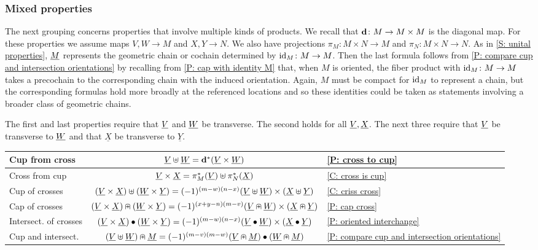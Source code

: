 \subsubsection{Mixed properties}\label{S: mixed formulas}

The next grouping concerns properties that involve multiple kinds of products.
We recall that $\mathbf{d} \colon M \to M \times M$ is the diagonal map.
For these properties we assume maps $V,W \to M$ and $X,Y \to N$.
We also have projections $\pi_M \colon M \times N \to M$ and $\pi_N \colon M \times N \to N$.
As in \cref{S: unital properties}, $\underline{M}$ represents the geometric chain or cochain determined by $\mathrm{id}_M \colon M \to M$.
Then the last formula follows from \cref{P: compare cup and intersection orientations} by recalling from \cref{P: cap with identity M} that, when $M$ is oriented, the fiber product with $\mathrm{id}_M \colon M \to M$ takes a precochain to the corresponding chain with the induced orientation.
Again, $M$ must be compact for $\mathrm{id}_M$ to represent a chain, but the corresponding formulas hold more broadly at the referenced locations and so these identities could be taken as statements involving a broader class of geometric chains.

The first and last properties require that $\underline{V}$ and $\underline{W}$ be transverse.
The second holds for all $\underline{V}, \underline{X}$.
The next three require that $\underline{V}$ be transverse to $\underline{W}$ and that $\underline{X}$ be transverse to $\underline{Y}$.



\begin{center}
	\begin{tabular}{|l|c|l|}
		\hline
		Cup from cross& $\underline{V}\uplus \underline{W} = \mathbf{d}^*(\underline{V} \times \underline{W})$&\ref{P: cross to cup}	\\
		\hline
		Cross from cup&$\underline{V} \times \underline{X} = \pi_M^*(\underline{V})\uplus\pi_N^*(\underline{X})$& \ref{C: cross is cup}	\\
		\hline
		Cup of crosses&$(\underline{V} \times \underline{X})\uplus (\underline{W} \times \underline{Y}) = (-1)^{(m-w)(n-x)} (\underline{V}\uplus \underline{W}) \times (\underline{X}\uplus \underline{Y})$ &	\ref{C: criss cross}\\
		\hline
		Cap of crosses &$(\underline{V} \times \underline{X})\nplus (\underline{W} \times \underline{Y}) = (-1)^{(x+y-n)(m-v)} (\underline{V} \nplus \underline{W}) \times (\underline{X}\nplus \underline{Y})$ & \ref{P: cap cross}\\
		\hline
		Intersect. of crosses &$(\underline{V} \times \underline{X})\bullet (\underline{W} \times \underline{Y}) = (-1)^{(m-w)(n-x)}(\underline{V}\bullet \underline{W}) \times (\underline{X}\bullet \underline{Y})$&\ref{P: oriented interchange}\\
		\hline
		Cup and intersect. &$(\underline{V}\uplus \underline{W})\nplus \underline{M} = (-1)^{(m-v)(m-w)}(\underline{V}\nplus \underline{M})\bullet(\underline{W}\nplus \underline{M})$&\ref{P: compare cup and intersection orientations}\\
		\hline
	\end{tabular}
\end{center}

